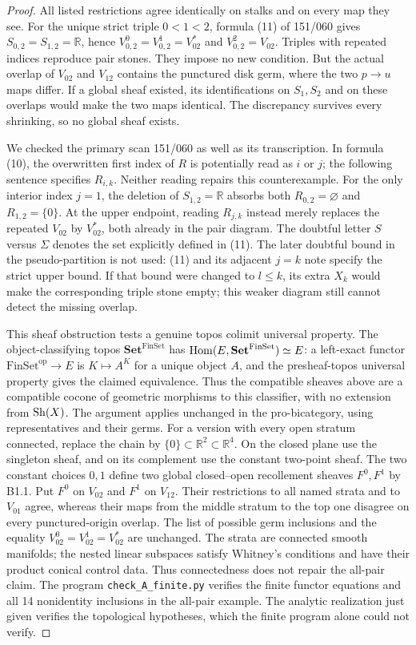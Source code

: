 \begin{proof}
All listed restrictions agree identically on stalks and on every map they
see. For the unique strict triple $0<1<2$, formula (11) of 151/060 gives
$S_{0,2}=S_{1,2}=\mathbb R$, hence
$V_{0,2}^{0}=V_{0,2}^{1}=V_{02}^*$ and $V_{0,2}^{2}=V_{02}$.
Triples with repeated indices reproduce pair stones. They impose no new
condition. But the actual overlap of $V_{02}$ and $V_{12}$ contains the
punctured disk germ, where the two $p\to u$ maps differ. If a global sheaf
existed, its identifications on $S_1,S_2$ and on these overlaps would make
the two maps identical. The discrepancy survives every shrinking, so no
global sheaf exists.

We checked the primary scan 151/060 as well as its transcription. In
formula (10), the overwritten first index of $R$ is potentially read as
$i$ or $j$; the following sentence specifies $R_{i,k}$. Neither reading
repairs this counterexample. For the only interior index $j=1$, the
deletion of $S_{1,2}=\mathbb R$ absorbs both $R_{0,2}=\varnothing$ and
$R_{1,2}=\{0\}$. At the upper endpoint, reading $R_{j,k}$ instead
merely replaces the repeated $V_{02}$ by $V_{02}^*$, both already in
the pair diagram. The doubtful letter $S$ versus $\Sigma$ denotes the
set explicitly defined in (11). The later doubtful bound in the
pseudo-partition is not used: (11) and its adjacent $j=k$ note specify
the strict upper bound. If that bound were changed to $l\leq k$, its
extra $X_k$ would make the corresponding triple stone empty; this
weaker diagram still cannot detect the missing overlap.

This sheaf obstruction tests a genuine topos colimit universal property.
The object-classifying topos $\mathbf{Set}^{\mathrm{FinSet}}$ has
$\operatorname{Hom}(E,\mathbf{Set}^{\mathrm{FinSet}})\simeq E$: a left-exact functor
$\mathrm{FinSet}^{\mathrm{op}}\to E$ is $K\mapsto A^K$ for a unique
object $A$, and the presheaf-topos universal property gives the claimed
equivalence. Thus the compatible sheaves above are a compatible cocone of
geometric morphisms to this classifier, with no extension from $\operatorname{Sh}(X)$.
The argument applies unchanged in the pro-bicategory, using representatives
and their germs. For a version with every open stratum connected, replace
the chain by $\{0\}\subset\mathbb R^2\subset\mathbb R^4$. On the closed
plane use the singleton sheaf, and on its complement use the constant
two-point sheaf. The two constant choices $0,1$ define two global
closed--open recollement sheaves $F^0,F^1$ by B1.1. Put $F^0$ on $V_{02}$
and $F^1$ on $V_{12}$. Their restrictions to all named strata and to
$V_{01}$ agree, whereas their maps from the middle stratum to the top
one disagree on every punctured-origin overlap. The list of possible
germ inclusions and the equality $V_{02}^{0}=V_{02}^{1}=V_{02}^*$ are
unchanged. The strata are connected smooth manifolds; the nested linear
subspaces satisfy Whitney's conditions and have their product conical
control data. Thus connectedness does not repair the all-pair claim.
The program \texttt{check\_A\_finite.py} verifies the
finite functor equations and all 14 nonidentity inclusions in the
all-pair example. The analytic realization just given verifies the
topological hypotheses, which the finite program alone could not verify.
\end{proof}

